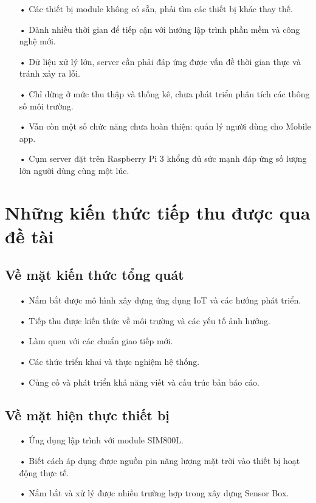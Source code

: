 \begin{itemize}
\item[•] Các thiết bị module không có sẵn, phải tìm các thiết bị khác thay thế.
\item[•] Dành nhiều thời gian để tiếp cận với hướng lập trình phần mềm và công nghệ mới.
\item[•] Dữ liệu xử lý lớn, server cần phải đáp ứng được vấn đề thời gian thực và tránh xảy ra lỗi.
\item[•] Chỉ dừng ở mức thu thập và thống kê, chưa phát triển phân tích các thông số môi trường.
\item[•] Vẫn còn một số chức năng chưa hoàn thiện: quản lý người dùng cho Mobile app.
\item[•] Cụm server đặt trên Raspberry Pi 3 khổng đủ sức mạnh đáp ứng số lượng lớn người dùng cùng một lúc.
\end{itemize}
\section{Những kiến thức tiếp thu được qua đề tài}
\subsection{Về mặt kiến thức tổng quát}
\begin{itemize}
	\item[•] Nắm bắt được mô hình xây dựng ứng dụng IoT và các hướng phát triển.
	\item[•] Tiếp thu được kiến thức về môi trường và các yếu tố ảnh hưởng.
	\item[•] Làm quen với các chuẩn giao tiếp mới.
	\item[•] Các thức triển khai và thực nghiệm hệ thống.
	\item[•] Củng cố và phát triển khả năng viết và cấu trúc bản báo cáo.
\end{itemize}
\subsection{Về mặt hiện thực thiết bị}
\begin{itemize}
	\item[•] Ứng dụng lập trình với module SIM800L.
	\item[•] Biết cách áp dụng được nguồn pin năng lượng mặt trời vào thiết bị hoạt động thực tế.
	\item[•] Nắm bắt và xử lý được nhiều trường hợp trong xây dựng Sensor Box.
\end{itemize}
